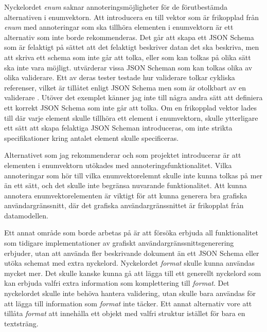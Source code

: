 Nyckelordet \textit{enum} saknar annoteringsmöjligheter för de förutbestämda alternativen i enumvektorn. Att introducera en till vektor som är frikopplad från \textit{enum} med annoteringar som ska tillhöra elementen i enumvektorn är ett alternativ som inte borde rekommenderas. Det går att skapa ett JSON Schema som är felaktigt på sättet att det felaktigt beskriver datan det ska beskriva, men att skriva ett schema som inte går att tolka, eller som kan tolkas på olika sätt ska inte vara möjligt. \citeauthor{Pezoa2016} utvärderar vissa JSON Scheman som kan tolkas olika av olika validerare. Ett av deras tester testade hur validerare tolkar cykliska referenser, vilket är tillåtet enligt JSON Schema men som är otolkbart av en validerare \cite[s.~264]{Pezoa2016}. Utöver det exemplet känner jag inte till några andra sätt att definiera ett korrekt JSON Schema som inte går att tolka. Om en frikopplad vektor lades till där varje element skulle tillhöra ett element i enumvektorn, skulle ytterligare ett sätt att skapa felaktiga JSON Scheman introduceras, om inte strikta specifikationer kring antalet element skulle specificeras.

Alternativet som jag rekommenderar och som projektet introducerar är att elementen i enumvektorn utökades med annoteringsfunktionalitet. Vilka annoteringar som hör till vilka enumvektorelemnt skulle inte kunna tolkas på mer än ett sätt, och det skulle inte begränsa nuvarande funktionalitet. Att kunna annotera enumvektorelementen är viktigt för att kunna generera bra grafiska användargränssnitt, där det grafiska användargränssnittet är frikopplat från datamodellen.

Ett annat område som borde arbetas på är att försöka erbjuda all funktionalitet som tidigare implementationer av grafiskt användargränssnittsgenerering erbjuder, utan att använda fler beskrivande dokument än ett JSON Schema eller utöka schemat med extra nyckelord. Nyckelordet \textit{format} skulle kunna användas mycket mer. Det skulle kanske kunna gå att lägga till ett generellt nyckelord som kan erbjuda valfri extra information som komplettering till \textit{format}. Det nyckelordet skulle inte behöva hantera validering, utan skulle bara användas för att lägga till information som \textit{format} inte täcker. Ett annat alternativ vore att tillåta \textit{format} att innehålla ett objekt med valfri struktur istället för bara en textsträng.

